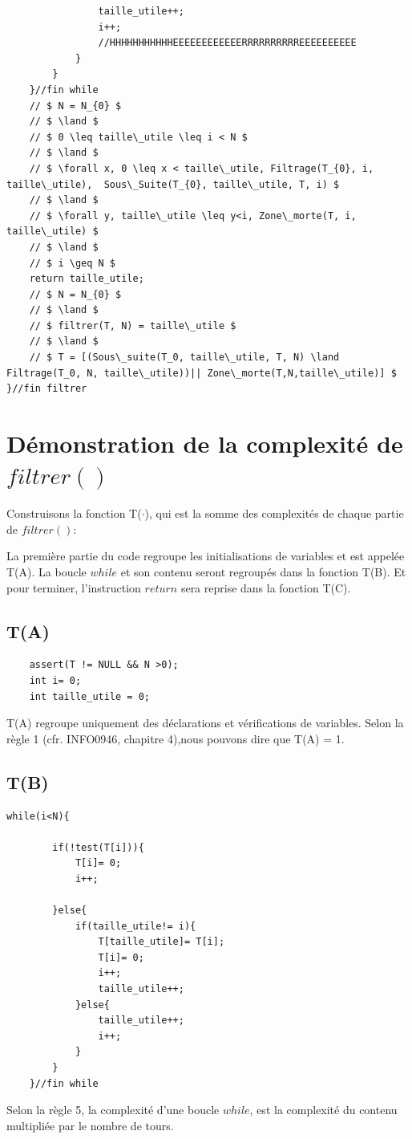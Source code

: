 \documentclass[a4paper, 11pt, oneside]{article}
\begin{document}
\begin{lstlisting}
                taille_utile++;
                i++;
                //HHHHHHHHHHHEEEEEEEEEEEERRRRRRRRRREEEEEEEEEE
            }
        }
    }//fin while
    // $ N = N_{0} $
    // $ \land $
    // $ 0 \leq taille\_utile \leq i < N $
    // $ \land $
    // $ \forall x, 0 \leq x < taille\_utile, Filtrage(T_{0}, i, taille\_utile),  Sous\_Suite(T_{0}, taille\_utile, T, i) $
    // $ \land $
    // $ \forall y, taille\_utile \leq y<i, Zone\_morte(T, i, taille\_utile) $
    // $ \land $
    // $ i \geq N $
    return taille_utile;
    // $ N = N_{0} $
    // $ \land $
    // $ filtrer(T, N) = taille\_utile $
    // $ \land $
    // $ T = [(Sous\_suite(T_0, taille\_utile, T, N) \land Filtrage(T_0, N, taille\_utile))|| Zone\_morte(T,N,taille\_utile)] $
}//fin filtrer
\end{lstlisting}

\section{Démonstration de la complexité de $filtrer()$}
Construisons la fonction T($\cdot$), qui est la somme des complexités de chaque partie de $filtrer()$:


La première partie du code regroupe les initialisations de variables et est appelée T(A). La boucle $while$ et son contenu seront regroupés dans la fonction T(B). Et pour terminer, l'instruction $return$ sera reprise dans la fonction T(C).

\subsection{T(A)}

\begin{lstlisting}
    assert(T != NULL && N >0);
    int i= 0;
    int taille_utile = 0;
\end{lstlisting}

T(A) regroupe uniquement des déclarations et vérifications de variables. Selon la règle 1 (cfr. INFO0946, chapitre 4),nous pouvons dire que T(A) = 1.


\subsection{T(B)}

\begin{lstlisting}
while(i<N){
          
        if(!test(T[i])){
            T[i]= 0;
            i++;
            
        }else{
            if(taille_utile!= i){
                T[taille_utile]= T[i];
                T[i]= 0;
                i++;
                taille_utile++;
            }else{
                taille_utile++;
                i++;
            }
        }
    }//fin while
\end{lstlisting}
Selon la règle 5, la complexité d'une boucle $while$, est la complexité du contenu multipliée par le nombre de tours.
\end{document}

